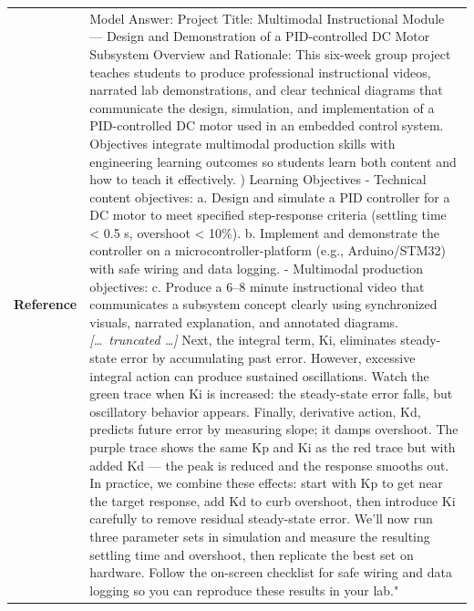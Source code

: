 \begin{longtable}{@{}l p{13cm}@{}}
  \textbf{Reference} & Model Answer: \newline Project Title: Multimodal Instructional Module --- Design and Demonstration of a PID-controlled DC Motor Subsystem \newline Overview and Rationale: This six-week group project teaches students to produce professional instructional videos, narrated lab demonstrations, and clear technical diagrams that communicate the design, simulation, and implementation of a PID-controlled DC motor used in an embedded control system. Objectives integrate multimodal production skills with engineering learning outcomes so students learn both content and how to teach it effectively. \newline 1) Learning Objectives \newline - Technical content objectives: \newline a. Design and simulate a PID controller for a DC motor to meet specified step-response criteria (settling time \textless{} 0.5 s, overshoot \textless{} 10\%). \newline b. Implement and demonstrate the controller on a microcontroller-platform (e.g., Arduino/STM32) with safe wiring and data logging. \newline - Multimodal production objectives: \newline c. Produce a 6--8 minute instructional video that communicates a subsystem concept clearly using synchronized visuals, narrated explanation, and annotated diagrams. \newline \textit{[\ldots\ truncated \ldots]} \newline Next, the integral term, Ki, eliminates steady-state error by accumulating past error. However, excessive integral action can produce sustained oscillations. Watch the green trace when Ki is increased: the steady-state error falls, but oscillatory behavior appears. \newline Finally, derivative action, Kd, predicts future error by measuring slope; it damps overshoot. The purple trace shows the same Kp and Ki as the red trace but with added Kd --- the peak is reduced and the response smooths out. In practice, we combine these effects: start with Kp to get near the target response, add Kd to curb overshoot, then introduce Ki carefully to remove residual steady-state error. \newline We'll now run three parameter sets in simulation and measure the resulting settling time and overshoot, then replicate the best set on hardware. Follow the on-screen checklist for safe wiring and data logging so you can reproduce these results in your lab."      \\

\end{longtable}
